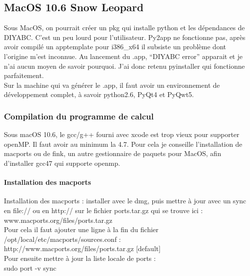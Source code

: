 \documentclass[12pt,a4paper]{article}
\begin{document}
    \subsection{MacOS 10.6 Snow Leopard}
        Sous MacOS, on pourrait cr\'eer un pkg qui installe python et les
        d\'ependances de DIYABC. C'est un peu lourd pour l'utilisateur. Py2app
        ne fonctionne pas, après avoir compil\'e un apptemplate pour i386\_x64
        il subsiste un problème dont l'origine m'est inconnue. Au lancement du
        .app, ``DIYABC error'' apparait et je n'ai aucun moyen de savoir
        pourquoi. J'ai donc retenu pyinstaller qui fonctionne parfaitement.\\

        Sur la machine qui va g\'en\'erer le .app, il faut avoir un
        environnement de d\'eveloppement complet, à savoir python2.6, PyQt4 et
        PyQwt5.

        \subsubsection{Compilation du programme de calcul}
        Sous macOS 10.6, le gcc/g++ fourni avec xcode est trop vieux pour supporter
        openMP. Il faut avoir au minimum la 4.7. Pour cela je conseille 
        l'installation de macports ou de fink, un autre gestionnaire de paquets pour MacOS,
        afin d'installer gcc47 qui supporte openmp.

        \paragraph{Installation des macports}
        Installation des macports : installer avec le dmg, puis mettre à jour
        avec un sync en file:// ou en http:// sur le fichier ports.tar.gz qui se trouve ici :
        \\
        www.macports.org/files/ports.tar.gz 
        \\
        Pour cela il faut ajouter une ligne à la fin
        du fichier \\
        /opt/local/etc/macports/sources.conf :\\

        http://www.macports.org/files/ports.tar.gz [default]\\

        Pour ensuite mettre à jour la liste locale de ports :\\

        sudo port -v sync\\
\end{document}
